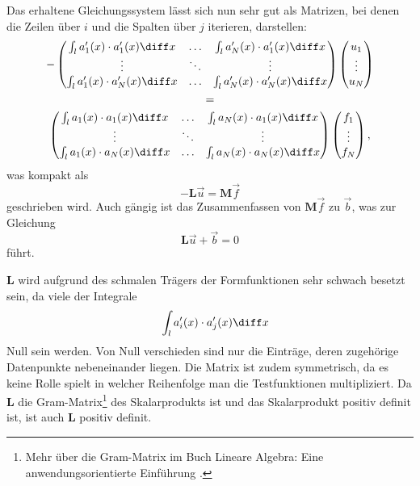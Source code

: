Das erhaltene Gleichungssystem lässt sich nun sehr gut als Matrizen, bei denen die Zeilen über $i$ und die Spalten über $j$ iterieren, darstellen:
\begin{multline}
    -\left(
        \begin{matrix}
            \int_l a'_1(x) \cdot a'_1(x) \diff x & \hdots & \int_l a'_N(x) \cdot a'_1(x) \diff x \\
            \vdots                               & \ddots & \vdots                               \\
            \int_l a'_1(x) \cdot a'_N(x) \diff x & \hdots & \int_l a'_N(x) \cdot a'_N(x) \diff x \\
        \end{matrix}
    \right)
    \left(
        \begin{matrix}
            u_1 \\
            \vdots \\
            u_N
        \end{matrix}
    \right) \\
    = \\
    \left(
        \begin{matrix}
            \int_l a_1(x) \cdot a_1(x) \diff x & \hdots & \int_l a_N(x) \cdot a_1(x) \diff x \\
            \vdots                             & \ddots & \vdots                             \\
            \int_l a_1(x) \cdot a_N(x) \diff x & \hdots & \int_l a_N(x) \cdot a_N(x) \diff x \\
        \end{matrix}
    \right)
    \left(
        \begin{matrix}
            f_1 \\
            \vdots \\
            f_N
        \end{matrix}
    \right),
\end{multline}
was kompakt als
\begin{equation}
    -\mathbf{L}\vec{u} = \mathbf{M}\vec{f}
\end{equation}
geschrieben wird.
Auch gängig ist das Zusammenfassen von $\mathbf{M}\vec{f}$ zu $\vec{b}$, was zur Gleichung
\begin{equation}
    \mathbf{L}\vec{u} + \vec{b} = 0
\end{equation}
führt.

$\mathbf{L}$ wird aufgrund des schmalen Trägers der Formfunktionen sehr schwach besetzt sein, da viele der Integrale
\begin{equation}
    \quad \int_l a'_i(x) \cdot a'_j(x) \diff x 
\end{equation}
Null sein werden.
Von Null verschieden sind nur die Einträge, deren zugehörige Datenpunkte nebeneinander liegen.
Die Matrix ist zudem symmetrisch, da es keine Rolle spielt in welcher Reihenfolge man die Testfunktionen multipliziert.
Da $\mathbf{L}$ die Gram-Matrix\footnote{Mehr über die Gram-Matrix im Buch Lineare Algebra: Eine anwendungsorientierte Einführung \cite{buch:linalg}.} des Skalarprodukts ist und das Skalarprodukt positiv definit ist, ist auch $\mathbf{L}$ positiv definit.

